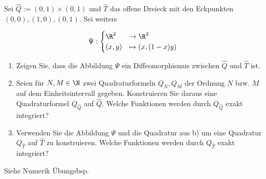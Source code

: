 
\begin{exercise}

Sei $\hat{Q}:= (0,1) \times (0,1)$ und $\hat{T}$ das offene Dreieck mit den Eckpunkten
$(0,0),(1,0),(0,1)$. Sei weiters

\begin{align*}
  \Psi:
  \begin{cases}
    \R^2 &\rightarrow \R^2 \\
    (x,y) & \mapsto (x,(1-x)y)
  \end{cases}
\end{align*}

\begin{enumerate}[label = \textbf{\alph*)}]
  \item Zeigen Sie, dass die Abbildung $\Psi$ ein Diffeomorphismus zwischen $\hat{Q}$ und $\hat{T}$ ist.
  \item Seien für $N, M \in \N$ zwei Quadraturformeln $Q_N, Q_M$ der Ordnung $N$ bzw. $M$ auf dem
  Einheitsintervall gegeben. Konstruieren Sie daraus eine Quadraturformel $Q_{\hat{Q}}$ auf $\hat{Q}$.
  Welche Funktionen werden durch $Q_{\hat{Q}}$ exakt integriert?
  \item Verwenden Sie die Abbildung $\Psi$ und die Quadratur aus b) um eine Quadratur $Q_{\hat{T}}$ auf $\hat{T}$
  zu konstruieren. Welche Funktionen werden durch $Q_{\hat{T}}$ exakt integriert?
  \end{enumerate}
\end{exercise}


\begin{solution}

Siehe Numerik Übungsbsp.

\end{solution}

